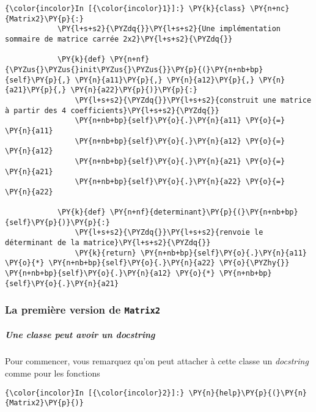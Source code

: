     \begin{Verbatim}[commandchars=\\\{\}]
{\color{incolor}In [{\color{incolor}1}]:} \PY{k}{class} \PY{n+nc}{Matrix2}\PY{p}{:}
            \PY{l+s+s2}{\PYZdq{}}\PY{l+s+s2}{Une implémentation sommaire de matrice carrée 2x2}\PY{l+s+s2}{\PYZdq{}}
        
            \PY{k}{def} \PY{n+nf}{\PYZus{}\PYZus{}init\PYZus{}\PYZus{}}\PY{p}{(}\PY{n+nb+bp}{self}\PY{p}{,} \PY{n}{a11}\PY{p}{,} \PY{n}{a12}\PY{p}{,} \PY{n}{a21}\PY{p}{,} \PY{n}{a22}\PY{p}{)}\PY{p}{:}
                \PY{l+s+s2}{\PYZdq{}}\PY{l+s+s2}{construit une matrice à partir des 4 coefficients}\PY{l+s+s2}{\PYZdq{}}
                \PY{n+nb+bp}{self}\PY{o}{.}\PY{n}{a11} \PY{o}{=} \PY{n}{a11}
                \PY{n+nb+bp}{self}\PY{o}{.}\PY{n}{a12} \PY{o}{=} \PY{n}{a12}
                \PY{n+nb+bp}{self}\PY{o}{.}\PY{n}{a21} \PY{o}{=} \PY{n}{a21}
                \PY{n+nb+bp}{self}\PY{o}{.}\PY{n}{a22} \PY{o}{=} \PY{n}{a22}
                
            \PY{k}{def} \PY{n+nf}{determinant}\PY{p}{(}\PY{n+nb+bp}{self}\PY{p}{)}\PY{p}{:}
                \PY{l+s+s2}{\PYZdq{}}\PY{l+s+s2}{renvoie le déterminant de la matrice}\PY{l+s+s2}{\PYZdq{}}
                \PY{k}{return} \PY{n+nb+bp}{self}\PY{o}{.}\PY{n}{a11} \PY{o}{*} \PY{n+nb+bp}{self}\PY{o}{.}\PY{n}{a22} \PY{o}{\PYZhy{}} \PY{n+nb+bp}{self}\PY{o}{.}\PY{n}{a12} \PY{o}{*} \PY{n+nb+bp}{self}\PY{o}{.}\PY{n}{a21}
\end{Verbatim}


    \hypertarget{la-premiuxe8re-version-de-matrix2}{%
\subsubsection{\texorpdfstring{La première version de
\texttt{Matrix2}}{La première version de Matrix2}}\label{la-premiuxe8re-version-de-matrix2}}

    \hypertarget{une-classe-peut-avoir-un-docstring}{%
\subparagraph{\texorpdfstring{Une classe peut avoir un
\emph{docstring}}{Une classe peut avoir un docstring}}\label{une-classe-peut-avoir-un-docstring}}

    Pour commencer, vous remarquez qu'on peut attacher à cette classe un
\emph{docstring} comme pour les fonctions

    \begin{Verbatim}[commandchars=\\\{\}]
{\color{incolor}In [{\color{incolor}2}]:} \PY{n}{help}\PY{p}{(}\PY{n}{Matrix2}\PY{p}{)}
\end{Verbatim}


